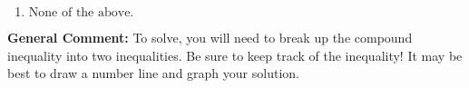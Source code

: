 \documentclass{extbook}[14pt]
\begin{document}
\begin{enumerate}
{\begin{enumerate}[label=\Alph*.]
$(-\infty, -1.05) \cup [7.80, \infty)$, which corresponds to displaying the and-inequality as an or-inequality.
\item \( \text{None of the above.} \)


\end{enumerate}

\textbf{General Comment:} To solve, you will need to break up the compound inequality into two inequalities. Be sure to keep track of the inequality! It may be best to draw a number line and graph your solution.
}
\end{enumerate}
\end{document}
